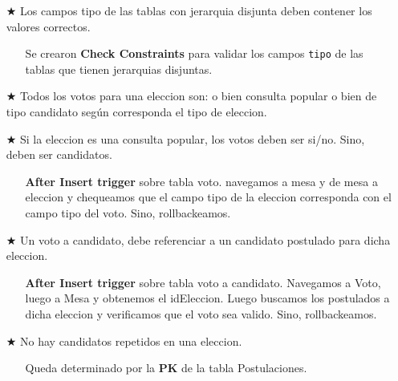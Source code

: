\begin{itemize}
		\item[$\bigstar$] Los campos tipo de las tablas con jerarquia disjunta deben contener los valores correctos. 
		\begin{itemize}
			\item[\Checkmark] Se crearon \textbf{Check Constraints} para validar los campos \texttt{tipo} de las tablas que tienen jerarquias disjuntas.
		\end{itemize}
\end{itemize}
\vspace{1.2cm}
\begin{itemize}
		\item[$\bigstar$] Todos los votos para una eleccion son: o bien consulta popular o bien de tipo candidato según corresponda el tipo de eleccion.
		\item[$\bigstar$] Si la eleccion es una consulta popular, los votos deben ser si/no. Sino, deben ser candidatos.
		\begin{itemize}
			\item[\Checkmark] \textbf{After Insert trigger} sobre tabla voto. navegamos a mesa y de mesa a eleccion y chequeamos que el campo tipo de la eleccion corresponda con el campo tipo del voto. Sino, rollbackeamos.
		\end{itemize}
\end{itemize}
\vspace{1.2cm}
\begin{itemize}
		\item[$\bigstar$] Un voto a candidato, debe referenciar a un candidato postulado para dicha eleccion.
		\begin{itemize}
			\item[\Checkmark] \textbf{After Insert trigger} sobre tabla voto a candidato. Navegamos a Voto, luego a Mesa y obtenemos el idEleccion. Luego buscamos los postulados a dicha eleccion y verificamos que el voto sea valido. Sino, rollbackeamos.
		\end{itemize}
\end{itemize}
\vspace{1.2cm}
\begin{itemize}
		\item[$\bigstar$] No hay candidatos repetidos en una eleccion.
		\begin{itemize}
			\item[\Checkmark] Queda determinado por la \textbf{PK} de la tabla Postulaciones.
		\end{itemize}
\end{itemize}

